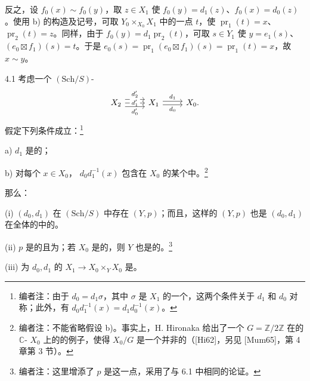 反之，设 $f_0(x)\sim f_0(y)$，取 $z\in X_1$ 使 $f_0(y)=d_1(z)$、$f_0(x)=d_0(z)$。使用 b) 的构造及记号，可取 $Y_0\times_{X_0}X_1$ 中的一点 $t$，使 $\operatorname{pr}_1(t)=x$、$\operatorname{pr}_2(t)=z$。同样，由于 $f_0(y)=d_1\operatorname{pr}_2(t)$，可取 $s\in Y_1$ 使 $y=e_1(s)$、$(e_0\boxtimes f_1)(s)=t$。于是 $e_0(s)=\operatorname{pr}_1(e_0\boxtimes f_1)(s)=\operatorname{pr}_1(t)=x$，故 $x\sim y$。

\begin{SGAresult}{}{4.1}
考虑一个 $(\mathrm{Sch}/S)$-
\[
\begin{tikzcd}
X_2\arrow[r,shift left=1ex,"d'_2"]\arrow[r,"d'_1" description]\arrow[r,shift right=1ex,"d'_0"']&X_1\arrow[r,shift left=.5ex,"d_1"]\arrow[r,shift right=.5ex,"d_0"']&X_0.
\end{tikzcd}
\]
假定下列条件成立：\footnote{编者注：由于 $d_0=d_1\sigma$，其中 $\sigma$ 是 $X_1$ 的一个，这两个条件关于 $d_1$ 和 $d_0$ 对称；此外，有 $d_0d_1^{-1}(x)=d_1d_0^{-1}(x)$。}

a) $d_1$ 是的；

b) 对每个 $x\in X_0$， $d_0d_1^{-1}(x)$ 包含在 $X_0$ 的某个中。\footnote{编者注：不能省略假设 b)。事实上，H. Hironaka 给出了一个 $G=\mathbb Z/2\mathbb Z$ 在的 $\mathbb C$- $X_0$ 上的的例子，使得 $X_0/G$ 是一个并非的（[Hi62]，另见 [Mum65]，第 4 章第 3 节）。}

那么：

(i) $(d_0,d_1)$ 在 $(\mathrm{Sch}/S)$ 中存在 $(Y,p)$；而且，这样的 $(Y,p)$ 也是 $(d_0,d_1)$ 在全体的中的。

(ii) $p$ 是的且为；若 $X_0$ 是的，则 $Y$ 也是的。\footnote{编者注：这里增添了 $p$ 是这一点，采用了与 6.1 中相同的论证。}

(iii) 为 $d_0,d_1$ 的 $X_1\to X_0\times_YX_0$ 是。


\end{SGAresult}
